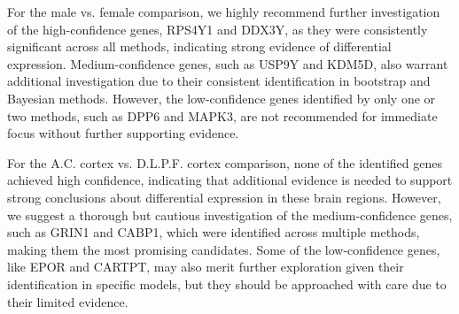 \documentclass[12pt]{article}
\begin{document}
For the male vs. female comparison, we highly recommend further investigation of the high-confidence genes, RPS4Y1 and DDX3Y, as they were consistently significant across all methods, indicating strong evidence of differential expression. Medium-confidence genes, such as USP9Y and KDM5D, also warrant additional investigation due to their consistent identification in bootstrap and Bayesian methods. However, the low-confidence genes identified by only one or two methods, such as DPP6 and MAPK3, are not recommended for immediate focus without further supporting evidence.




For the A.C. cortex vs. D.L.P.F. cortex comparison, none of the identified genes achieved high confidence, indicating that additional evidence is needed to support strong conclusions about differential expression in these brain regions. However, we suggest a thorough but cautious investigation of the medium-confidence genes, such as GRIN1 and CABP1, which were identified across multiple methods, making them the most promising candidates. Some of the low-confidence genes, like EPOR and CARTPT, may also merit further exploration given their identification in specific models, but they should be approached with care due to their limited evidence.
\end{document}
